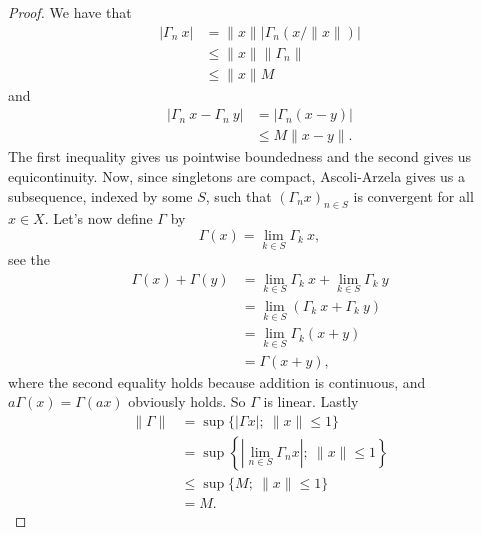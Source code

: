 \documentclass[a4paper,12pt,twoside,BCOR=10mm]{scrbook}
\theoremstyle{definition}
\theoremstyle{definition}
\theoremstyle{definition}
\begin{document}
\begin{proof}
We have that
\begin{align*}
	|\Gamma_n\ x|
	&= \|x\| |\Gamma_n (x/\|x\|)|\\
	&\leq \|x\| \|\Gamma_n \|\\
	&\leq \|x\| M
\end{align*}
and
\begin{align*}
	|\Gamma_n\ x - \Gamma_n\ y|
	&= |\Gamma_n (x - y)|\\
	&\leq M\|x - y\|.
\end{align*}
The first inequality gives us pointwise boundedness and the second gives us equicontinuity.
Now, since singletons are compact, Ascoli-Arzela gives us a subsequence, indexed by some $S$, such that $(\Gamma_n x)_{n \in S}$ is convergent for all $x \in X$.
Let's now define $\Gamma$ by
\[
	\Gamma(x) = \lim_{k \in S} \Gamma_k\ x,
\]
see the
\begin{align*}
	\Gamma(x) + \Gamma(y)
	&= \lim_{k \in S} \Gamma_k\ x + \lim_{k \in S} \Gamma_k\ y\\
	&= \lim_{k \in S} \left ( \Gamma_k\ x + \Gamma_k\ y \right )\\
	&= \lim_{k \in S} \Gamma_k(x + y)\\
	&= \Gamma(x + y),
\end{align*}
where the second equality holds because addition is continuous, and $a\Gamma(x) = \Gamma(ax)$ obviously holds.
So $\Gamma$ is linear.
Lastly
\begin{align*}
	\|\Gamma\|
	&= \sup \{|\Gamma x|;\ \|x\| \leq 1\}\\
	&= \sup \left \{ \left |\lim_{n \in S} \Gamma_n x \right|;\ \|x\| \leq 1 \right \}\\
	&\leq \sup \{ M;\ \|x\| \leq 1 \}\\
	&= M.
\end{align*}
\end{proof}
\end{document}

